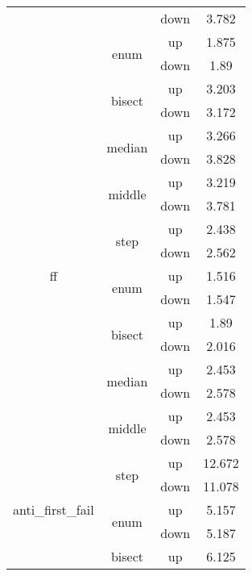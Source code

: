 \begin{table}[h!]
{\begin{tabular}{|c|c|c|c|}
                            &                         & down & 3.782 \\
                            & \multirow{2}{*}{enum} & up & 1.875 \\ 
                            &                         & down & 1.89 \\
                            & \multirow{2}{*}{bisect} & up & 3.203 \\ 
                            &                         & down & 3.172 \\
                            & \multirow{2}{*}{median} & up & 3.266 \\ 
                            &                         & down & 3.828 \\
                            & \multirow{2}{*}{middle} & up & 3.219 \\ 
                            &                         & down & 3.781 \\
 \hline
\multirow{5}{*}{ff} & \multirow{2}{*}{step} & up & 2.438 \\ 
                            &                         & down & 2.562 \\
                            & \multirow{2}{*}{enum} & up & 1.516 \\ 
                            &                         & down & 1.547 \\
                            & \multirow{2}{*}{bisect} & up & 1.89 \\ 
                            &                         & down & 2.016 \\
                            & \multirow{2}{*}{median} & up & 2.453 \\ 
                            &                         & down & 2.578 \\
                            & \multirow{2}{*}{middle} & up & 2.453 \\ 
                            &                         & down & 2.578 \\
 \hline
\multirow{5}{*}{anti\_first\_fail} & \multirow{2}{*}{step} & up & 12.672 \\ 
                            &                         & down & 11.078 \\
                            & \multirow{2}{*}{enum} & up & 5.157 \\ 
                            &                         & down & 5.187 \\
                            & \multirow{2}{*}{bisect} & up & 6.125 \\ 

\end{tabular}}
\end{table}

